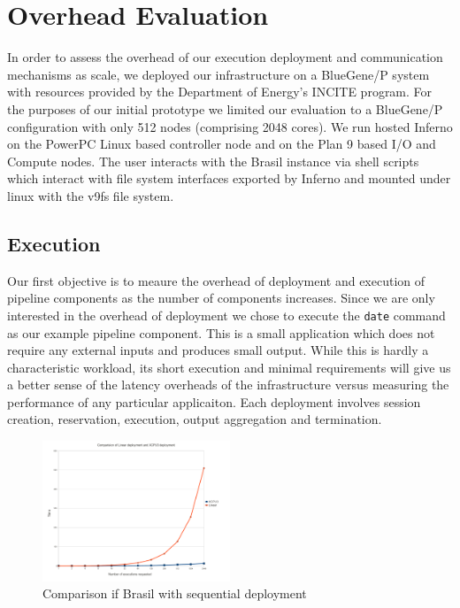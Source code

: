 \section{Overhead Evaluation}
In order to assess the overhead of our execution deployment and communication
mechanisms as scale, we deployed our infrastructure on a BlueGene/P system
with resources provided by the Department of Energy's INCITE program.
For the purposes of our initial prototype we limited our evaluation to a
BlueGene/P configuration with only 512 nodes (comprising 2048 cores).
We run hosted Inferno on the PowerPC Linux based controller node and on
the Plan 9 based I/O and Compute nodes.
The user interacts with the Brasil instance via shell scripts which 
interact with file system interfaces exported by Inferno and mounted 
under linux with the v9fs file system.

\subsection{Execution}

Our first objective is to meaure the overhead of deployment and execution
of pipeline components as the number of components increases.  Since we 
are only interested in the overhead of deployment we chose to execute the
\texttt{date} command as our example pipeline component.
This is a small application which does not require any external inputs 
and produces small output. 
While this is hardly a characteristic workload, its short execution and
minimal requirements will give us a better sense of the latency overheads
of the infrastructure versus measuring the performance of any particular
applicaiton.
Each deployment involves
session creation, reservation, execution, output aggregation and termination.

\begin{figure}[h]
  \begin{center}
    \leavevmode
      \includegraphics[height=0.2\textheight,width=0.5\textwidth]
		{./img/linear}
    \caption{Comparison if Brasil with sequential deployment}
    \label{fig:sequential}
  \end{center}
\end{figure}

